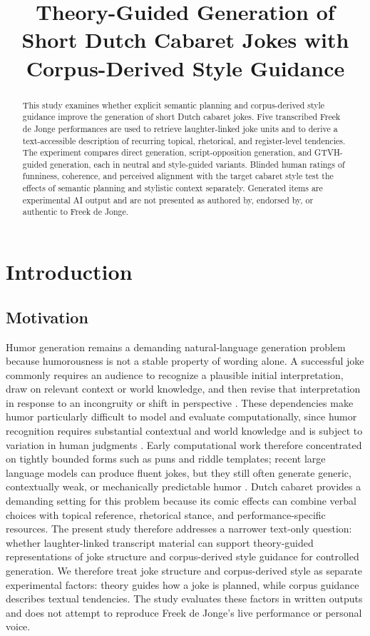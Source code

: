 \documentclass[11pt]{article}
\title{Theory-Guided Generation of Short Dutch Cabaret Jokes with Corpus-Derived Style Guidance}
\author{}
\begin{document}
\maketitle
\begin{abstract}

This study examines whether explicit semantic planning and corpus-derived style guidance improve the generation of short Dutch cabaret jokes. Five transcribed Freek de Jonge performances are used to retrieve laughter-linked joke units and to derive a text-accessible description of recurring topical, rhetorical, and register-level tendencies. The experiment compares direct generation, script-opposition generation, and GTVH-guided generation, each in neutral and style-guided variants. Blinded human ratings of funniness, coherence, and perceived alignment with the target cabaret style test the effects of semantic planning and stylistic context separately. Generated items are experimental AI output and are not presented as authored by, endorsed by, or authentic to Freek de Jonge.

\end{abstract}

\section{Introduction}

\subsection{Motivation}\label{motivation}

Humor generation remains a demanding natural-language generation problem because humorousness is not a stable property of wording alone. A successful joke commonly requires an audience to recognize a plausible initial interpretation, draw on relevant context or world knowledge, and then revise that interpretation in response to an incongruity or shift in perspective \citep{yus2017incongruity}. These dependencies make humor particularly difficult to model and evaluate computationally, since humor recognition requires substantial contextual and world knowledge and is subject to variation in human judgments \citep{kalloniatis2025humor}. Early computational work therefore concentrated on tightly bounded forms such as puns and riddle templates; recent large language models can produce fluent jokes, but they still often generate generic, contextually weak, or mechanically predictable humor \citep{ritchie2009,amin2020survey,lemmens2026roast}. Dutch cabaret provides a demanding setting for this problem because its comic effects can combine verbal choices with topical reference, rhetorical stance, and performance-specific resources. The present study therefore addresses a narrower text-only question: whether laughter-linked transcript material can support theory-guided representations of joke structure and corpus-derived style guidance for controlled generation. We therefore treat joke structure and corpus-derived style as separate experimental factors: theory guides how a joke is planned, while corpus guidance describes textual tendencies. The study evaluates these factors in written outputs and does not attempt to reproduce Freek de Jonge's live performance or personal voice.
\end{document}
